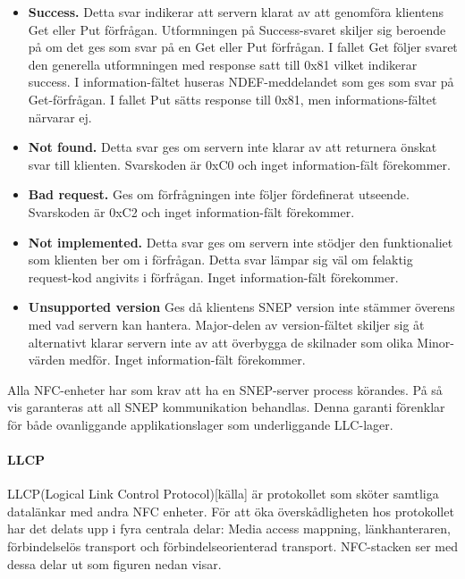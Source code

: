 \documentclass[11pt]{article}
\begin{document}
\begin{itemize}
\item \textbf{Success.} Detta svar indikerar att servern klarat av att genomföra klientens Get eller Put förfrågan. Utformningen på Success-svaret skiljer sig beroende på om det ges som svar på en Get eller Put förfrågan. I fallet Get följer svaret den generella utformningen med response satt till 0x81 vilket indikerar success. I information-fältet huseras NDEF-meddelandet som ges som svar på Get-förfrågan. I fallet Put sätts response till 0x81, men informations-fältet närvarar ej.
\item \textbf{Not found.} Detta svar ges om servern inte klarar av att returnera önskat svar till klienten. Svarskoden är 0xC0 och inget information-fält förekommer.
\item \textbf{Bad request.} Ges om förfrågningen inte följer fördefinerat utseende. Svarskoden är 0xC2 och inget information-fält förekommer.
\item \textbf{Not implemented.} Detta svar ges om servern inte stödjer den funktionaliet som klienten ber om i förfrågan. Detta svar lämpar sig väl om felaktig request-kod angivits i förfrågan. Inget information-fält förekommer.
\item \textbf{Unsupported version} Ges då klientens SNEP version inte stämmer överens med vad servern kan hantera. Major-delen av version-fältet skiljer sig åt alternativt klarar servern inte av att överbygga de skilnader som olika Minor-värden medför. Inget information-fält förekommer.
\end{itemize}

Alla NFC-enheter har som krav att ha en SNEP-server process körandes. På så vis garanteras att all SNEP kommunikation behandlas. Denna garanti förenklar för både ovanliggande applikationslager som underliggande LLC-lager.

\paragraph{LLCP}
LLCP(Logical Link Control Protocol)[källa] är protokollet som sköter samtliga datalänkar med andra NFC enheter. För att öka överskådligheten hos protokollet har det delats upp i fyra centrala delar: Media access mappning, länkhanteraren, förbindelselös transport och förbindelseorienterad transport. NFC-stacken ser med dessa delar ut som figuren nedan visar.
\end{document}
